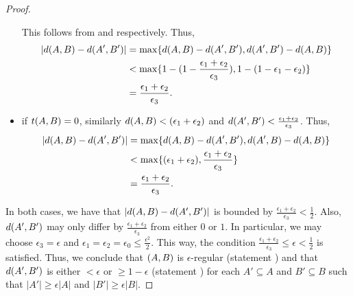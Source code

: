 \begin{lemma}
\begin{proof}
\begin{itemize}
                        This follows from
                         and
                         respectively.
                        Thus,
                        \begin{align*}
                            | d ( A,B ) - d ( A',B' ) |
                                & = \max \{ d ( A,B ) - d ( A',B' ), d ( A',B' ) - d ( A,B ) \} \\
                                & < \max \{  1 - ( 1 - \frac{\epsilon_1 + \epsilon_2}{\epsilon_3} ),
                                    1 - ( 1 - \epsilon_1 - \epsilon_2 ) \} \\
                                & = \frac{\epsilon_1 + \epsilon_2}{\epsilon_3}.
                        \end{align*}
                    \item if $t( A,B ) = 0$, similarly $d( A,B ) < ( \epsilon_1 + \epsilon_2 )$
                        and $d ( A',B' ) < \frac{\epsilon_1 + \epsilon_2}{\epsilon_3}$.
                        Thus,
                        \begin{align*}
                            | d ( A,B ) - d ( A',B' ) |
                                & = \max \{ d ( A,B ) - d ( A',B' ), d ( A',B ) - d ( A,B ) \} \\
                                & < \max \{ ( \epsilon_1 + \epsilon_2 ), \frac{\epsilon_1 + \epsilon_2}{\epsilon_3} \} \\
                                & = \frac{\epsilon_1 + \epsilon_2}{\epsilon_3}.
                        \end{align*}
                \end{itemize}
                In both cases, we have that $| d ( A,B ) - d ( A',B' ) |$ is bounded by
                $\frac{\epsilon_1 + \epsilon_2}{\epsilon_3} < \frac{1}{2}$.
                Also, $d ( A', B' )$ may only differ by $\frac{\epsilon_1 + \epsilon_2}{\epsilon_3}$ from either
                $0$ or $1$.
                In particular, we may choose $\epsilon_3 = \epsilon$ and $\epsilon_1 = \epsilon_2 = \epsilon_0 \leq \frac{\epsilon^2}{2}$.
                This way, the condition $\frac{\epsilon_1 + \epsilon_2}{\epsilon_3} \leq \epsilon < \frac{1}{2}$ is satisfied.
                Thus, we conclude that $( A,B )$ is $\epsilon$-regular (statement )
                and that $d ( A',B' )$ is either $< \epsilon$ or $\geq 1 - \epsilon$ (statement )
                for each $A' \subseteq A$ and $B' \subseteq B$ such that $|A'| \geq \epsilon |A|$ and $|B'| \geq \epsilon |B|$.
            \end{proof}
        \end{lemma}

